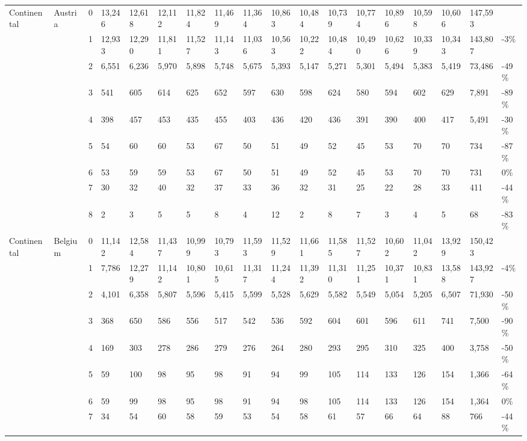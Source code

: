 \begin{longtable}{llllllllllllllllll}
  Continental & Austria & 0 & 13,246 & 12,618 & 12,112 & 11,824 & 11,469 & 11,364 & 10,863 & 10,484 & 10,739 & 10,774 & 10,896 & 10,598 & 10,606 & 147,593 &  \\ 
   &  & 1 & 12,933 & 12,290 & 11,811 & 11,527 & 11,143 & 11,036 & 10,563 & 10,222 & 10,484 & 10,490 & 10,626 & 10,339 & 10,343 & 143,807 & -3\% \\ 
   &  & 2 & 6,551 & 6,236 & 5,970 & 5,898 & 5,748 & 5,675 & 5,393 & 5,147 & 5,271 & 5,301 & 5,494 & 5,383 & 5,419 & 73,486 & -49\% \\ 
   &  & 3 & 541 & 605 & 614 & 625 & 652 & 597 & 630 & 598 & 624 & 580 & 594 & 602 & 629 & 7,891 & -89\% \\ 
   &  & 4 & 398 & 457 & 453 & 435 & 455 & 403 & 436 & 420 & 436 & 391 & 390 & 400 & 417 & 5,491 & -30\% \\ 
   &  & 5 & 54 & 60 & 60 & 53 & 67 & 50 & 51 & 49 & 52 & 45 & 53 & 70 & 70 & 734 & -87\% \\ 
   &  & 6 & 53 & 59 & 59 & 53 & 67 & 50 & 51 & 49 & 52 & 45 & 53 & 70 & 70 & 731 & 0\% \\ 
   &  & 7 & 30 & 32 & 40 & 32 & 37 & 33 & 36 & 32 & 31 & 25 & 22 & 28 & 33 & 411 & -44\% \\ 
   &  & 8 & 2 & 3 & 5 & 5 & 8 & 4 & 12 & 2 & 8 & 7 & 3 & 4 & 5 & 68 & -83\% \\ 
  Continental & Belgium & 0 & 11,142 & 12,584 & 11,437 & 10,999 & 10,793 & 11,593 & 11,529 & 11,661 & 11,585 & 11,527 & 10,602 & 11,042 & 13,929 & 150,423 &  \\ 
   &  & 1 & 7,786 & 12,279 & 11,142 & 10,801 & 10,615 & 11,317 & 11,244 & 11,392 & 11,310 & 11,251 & 10,371 & 10,831 & 13,588 & 143,927 & -4\% \\ 
   &  & 2 & 4,101 & 6,358 & 5,807 & 5,596 & 5,415 & 5,599 & 5,528 & 5,629 & 5,582 & 5,549 & 5,054 & 5,205 & 6,507 & 71,930 & -50\% \\ 
   &  & 3 & 368 & 650 & 586 & 556 & 517 & 542 & 536 & 592 & 604 & 601 & 596 & 611 & 741 & 7,500 & -90\% \\ 
   &  & 4 & 169 & 303 & 278 & 286 & 279 & 276 & 264 & 280 & 293 & 295 & 310 & 325 & 400 & 3,758 & -50\% \\ 
   &  & 5 & 59 & 100 & 98 & 95 & 98 & 91 & 94 & 99 & 105 & 114 & 133 & 126 & 154 & 1,366 & -64\% \\ 
   &  & 6 & 59 & 99 & 98 & 95 & 98 & 91 & 94 & 98 & 105 & 114 & 133 & 126 & 154 & 1,364 & 0\% \\ 
   &  & 7 & 34 & 54 & 60 & 58 & 59 & 53 & 54 & 58 & 61 & 57 & 66 & 64 & 88 & 766 & -44\% \\ 

\end{longtable}

